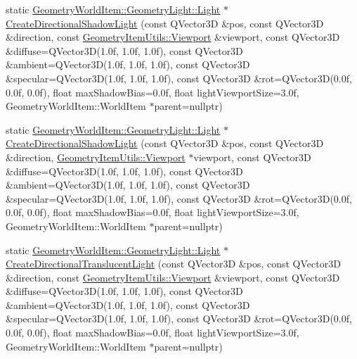 \begin{DoxyCompactItemize}
\item 
static \mbox{\hyperlink{class_geometry_engine_1_1_geometry_world_item_1_1_geometry_light_1_1_light}{Geometry\+World\+Item\+::\+Geometry\+Light\+::\+Light}} $\ast$ \mbox{\hyperlink{class_geometry_engine_1_1_geometry_factory_ae663bbb598b21a847eae1b62a7547580}{Create\+Directional\+Shadow\+Light}} (const Q\+Vector3D \&pos, const Q\+Vector3D \&direction, const \mbox{\hyperlink{class_geometry_engine_1_1_geometry_item_utils_1_1_viewport}{Geometry\+Item\+Utils\+::\+Viewport}} \&viewport, const Q\+Vector3D \&diffuse=Q\+Vector3D(1.\+0f, 1.\+0f, 1.\+0f), const Q\+Vector3\+D \&ambient=\+Q\+Vector3\+D(1.\+0f, 1.\+0f, 1.\+0f), const Q\+Vector3\+D \&specular=\+Q\+Vector3\+D(1.\+0f, 1.\+0f, 1.\+0f), const Q\+Vector3\+D \&rot=\+Q\+Vector3\+D(0.\+0f, 0.\+0f, 0.\+0f), float max\+Shadow\+Bias=0.\+0f, float light\+Viewport\+Size=3.\+0f, Geometry\+World\+Item\+::\+World\+Item $\ast$parent=nullptr)
\item 
static \mbox{\hyperlink{class_geometry_engine_1_1_geometry_world_item_1_1_geometry_light_1_1_light}{Geometry\+World\+Item\+::\+Geometry\+Light\+::\+Light}} $\ast$ \mbox{\hyperlink{class_geometry_engine_1_1_geometry_factory_ab14ce0c00c6353be91a511572c89ae30}{Create\+Directional\+Shadow\+Light}} (const Q\+Vector3D \&pos, const Q\+Vector3D \&direction, \mbox{\hyperlink{class_geometry_engine_1_1_geometry_item_utils_1_1_viewport}{Geometry\+Item\+Utils\+::\+Viewport}} $\ast$viewport, const Q\+Vector3D \&diffuse=Q\+Vector3D(1.\+0f, 1.\+0f, 1.\+0f), const Q\+Vector3\+D \&ambient=\+Q\+Vector3\+D(1.\+0f, 1.\+0f, 1.\+0f), const Q\+Vector3\+D \&specular=\+Q\+Vector3\+D(1.\+0f, 1.\+0f, 1.\+0f), const Q\+Vector3\+D \&rot=\+Q\+Vector3\+D(0.\+0f, 0.\+0f, 0.\+0f), float max\+Shadow\+Bias=0.\+0f, float light\+Viewport\+Size=3.\+0f, Geometry\+World\+Item\+::\+World\+Item $\ast$parent=nullptr)
\item 
static \mbox{\hyperlink{class_geometry_engine_1_1_geometry_world_item_1_1_geometry_light_1_1_light}{Geometry\+World\+Item\+::\+Geometry\+Light\+::\+Light}} $\ast$ \mbox{\hyperlink{class_geometry_engine_1_1_geometry_factory_aa019de822c2d40a7bd693e1e970e7fe6}{Create\+Directional\+Translucent\+Light}} (const Q\+Vector3D \&pos, const Q\+Vector3D \&direction, const \mbox{\hyperlink{class_geometry_engine_1_1_geometry_item_utils_1_1_viewport}{Geometry\+Item\+Utils\+::\+Viewport}} \&viewport, const Q\+Vector3D \&diffuse=Q\+Vector3D(1.\+0f, 1.\+0f, 1.\+0f), const Q\+Vector3\+D \&ambient=\+Q\+Vector3\+D(1.\+0f, 1.\+0f, 1.\+0f), const Q\+Vector3\+D \&specular=\+Q\+Vector3\+D(1.\+0f, 1.\+0f, 1.\+0f), const Q\+Vector3\+D \&rot=\+Q\+Vector3\+D(0.\+0f, 0.\+0f, 0.\+0f), float max\+Shadow\+Bias=0.\+0f, float light\+Viewport\+Size=3.\+0f, Geometry\+World\+Item\+::\+World\+Item $\ast$parent=nullptr)

\end{DoxyCompactItemize}
